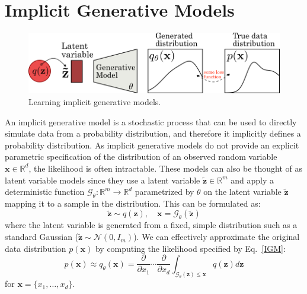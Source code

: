 \section{Implicit Generative Models}\label{ImplicitGen}
\begin{figure}[htb]
  \begin{center}
  \includegraphics[width=\linewidth]{figures/implicitgen.png}
  \end{center}
  \caption{Learning implicit generative models.}\label{fig:implicit_gen}
\end{figure}
An implicit generative model is a stochastic process that can be used to directly simulate data from a probability distribution, and therefore it implicitly defines a probability distribution. As implicit generative models do not provide an explicit parametric specification of the
distribution of an observed random variable $\mathbf{x}\in \mathbb{R}^d$, the likelihood is often intractable. These models can also be thought of as latent variable models since they use a latent variable $\mathbf{\tilde{z}} \in \mathbb{R}^m$ and apply a deterministic function $\mathcal{G}_\theta: \mathbb{R}^m\rightarrow \mathbb{R}^d$ parametrized by $\theta$ on the latent variable $\mathbf{\tilde{z}}$ mapping it to a sample in the distribution. This can be formulated as:
\begin{equation}\label{IGM}
    \mathbf{\tilde{z}} \sim q(\mathbf{z}), \quad \mathbf{x} =  \mathcal{G}_\theta(\mathbf{\tilde{z}})
\end{equation}
where the latent variable is generated from a fixed, simple distribution such as a standard Gaussian ($\mathbf{\tilde{z}} \sim \mathcal{N}\left(0, I_m\right)$). We can effectively approximate the original data distribution $p(\mathbf{x})$ by computing the likelihood specified by Eq.~\ref{IGM}:
\begin{equation}\label{IGMLikelihood}
    p(\mathbf{x}) \approx q_\theta(\mathbf{x}) = \frac{\partial}{\partial x_1} \cdots \frac{\partial}{\partial x_d} \int_{\mathcal{G}_\theta(\mathbf{z}) \leq \mathbf{x}} q(\mathbf{z}) d\mathbf{z}
\end{equation}
for $\mathbf{x}=\{x_1, \ldots, x_d\}$. 


